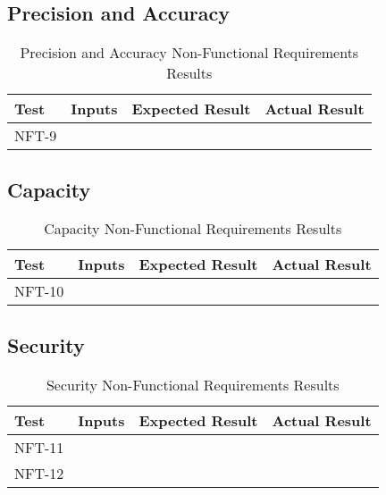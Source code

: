\documentclass[12pt, titlepage]{article}
\begin{document}
\subsection{Precision and Accuracy}

\begin{table}[H]
  \centering
    \setlength{\leftmargini}{0cm}
    \begin{tabular}{| >{\centering\arraybackslash}m{1.5cm} | 
      >{\centering\arraybackslash}m{4cm} | 
      >{\centering\arraybackslash}m{4cm} | 
      >{\centering\arraybackslash}m{4cm} |}
    \hline
    \rowcolor[gray]{0.9}
    Test & Inputs & Expected Result & Actual Result\\
    \hline
    NFT-9 &  &  & \\
    \hline
    \end{tabular}
  \caption{Precision and Accuracy Non-Functional Requirements Results}
\end{table}

\subsection{Capacity}

\begin{table}[H]
  \centering
    \setlength{\leftmargini}{0cm}
    \begin{tabular}{| >{\centering\arraybackslash}m{1.5cm} | 
      >{\centering\arraybackslash}m{4cm} | 
      >{\centering\arraybackslash}m{4cm} | 
      >{\centering\arraybackslash}m{4cm} |}
    \hline
    \rowcolor[gray]{0.9}
    Test & Inputs & Expected Result & Actual Result\\
    \hline
    NFT-10 &  &  & \\
    \hline
    \end{tabular}
  \caption{Capacity Non-Functional Requirements Results}
\end{table}

\subsection{Security}

\begin{table}[H]
  \centering
    \setlength{\leftmargini}{0cm}
    \begin{tabular}{| >{\centering\arraybackslash}m{1.5cm} | 
      >{\centering\arraybackslash}m{4cm} | 
      >{\centering\arraybackslash}m{4cm} | 
      >{\centering\arraybackslash}m{4cm} |}
    \hline
    \rowcolor[gray]{0.9}
    Test & Inputs & Expected Result & Actual Result\\
    \hline
    NFT-11 &  &  & \\
    \hline
    NFT-12 &  &  & \\
    \hline
    \end{tabular}
  \caption{Security Non-Functional Requirements Results}
\end{table}
\end{document}
